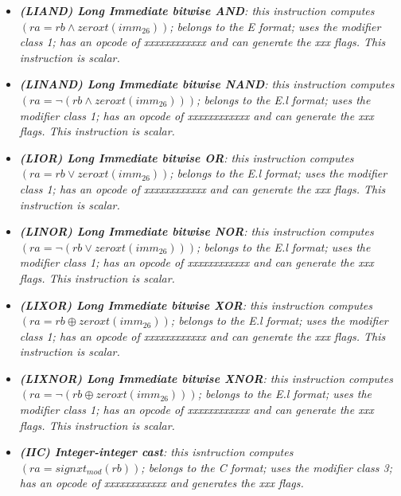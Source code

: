\begin{multicols}{2}
\begin{itemize}
                \item \textit{\textbf{(LIAND) Long Immediate bitwise AND}: this instruction computes \((ra = rb \wedge zeroxt(imm_{26}))\); belongs to the E format; uses the modifier class 1; has an opcode of xxxxxxxxxxxx and can generate the xxx flags. This instruction is scalar.}

                \item \textit{\textbf{(LINAND) Long Immediate bitwise NAND}: this instruction computes \((ra = \neg(rb \wedge zeroxt(imm_{26})))\); belongs to the E.l format; uses the modifier class 1; has an opcode of xxxxxxxxxxxx and can generate the xxx flags. This instruction is scalar.}

                \item \textit{\textbf{(LIOR) Long Immediate bitwise OR}: this instruction computes \((ra = rb \vee zeroxt(imm_{26}))\); belongs to the E.l format; uses the modifier class 1; has an opcode of xxxxxxxxxxxx and can generate the xxx flags. This instruction is scalar.}

                \item \textit{\textbf{(LINOR) Long Immediate bitwise NOR}: this instruction computes \((ra = \neg(rb \vee zeroxt(imm_{26})))\); belongs to the E.l format; uses the modifier class 1; has an opcode of xxxxxxxxxxxx and can generate the xxx flags. This instruction is scalar.}

                \item \textit{\textbf{(LIXOR) Long Immediate bitwise XOR}: this instruction computes \((ra = rb \oplus zeroxt(imm_{26}))\); belongs to the E.l format; uses the modifier class 1; has an opcode of xxxxxxxxxxxx and can generate the xxx flags. This instruction is scalar.}

                \item \textit{\textbf{(LIXNOR) Long Immediate bitwise XNOR}: this instruction computes \((ra = \neg(rb \oplus zeroxt(imm_{26})))\); belongs to the E.l format; uses the modifier class 1; has an opcode of xxxxxxxxxxxx and can generate the xxx flags. This instruction is scalar.}

                \item \textit{\textbf{(IIC) Integer-integer cast}: this isntruction computes \((ra = signxt_{mod}(rb))\); belongs to the C format; uses the modifier class 3; has an opcode of xxxxxxxxxxxx and generates the xxx flags.}

            \end{itemize}

        \end{multicols}

